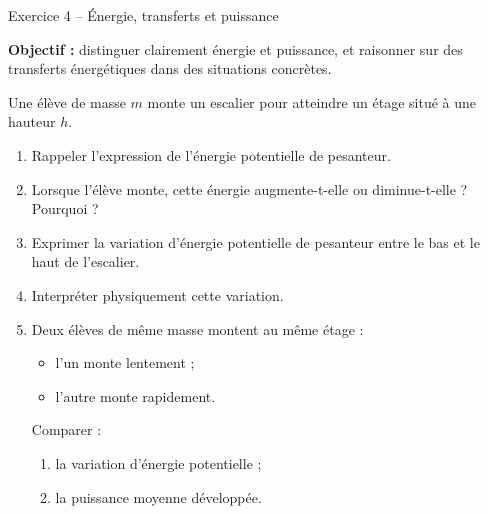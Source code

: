 \documentclass[11pt,a4paper]{article}
\begin{document}
\begin{exobox}{Exercice 4 -- Énergie, transferts et puissance}
\begin{objectifbox}
\textbf{Objectif :} distinguer clairement énergie et puissance, et raisonner sur des transferts énergétiques dans des situations concrètes.
\end{objectifbox}

Une élève de masse \(m\) monte un escalier pour atteindre un étage situé à une hauteur \(h\).

\begin{center}
\end{center}

\begin{enumerate}[label=\textbf{\arabic*.}]
    \item Rappeler l’expression de l’énergie potentielle de pesanteur.

    \item Lorsque l’élève monte, cette énergie augmente-t-elle ou diminue-t-elle ? Pourquoi ?

    \item Exprimer la variation d’énergie potentielle de pesanteur entre le bas et le haut de l’escalier.

    \item Interpréter physiquement cette variation.

    \item Deux élèves de même masse montent au même étage :
    \begin{itemize}
        \item l’un monte lentement ;
        \item l’autre monte rapidement.
    \end{itemize}
    Comparer :
    \begin{enumerate}[label=\alph*)]
        \item la variation d’énergie potentielle ;
        \item la puissance moyenne développée.
    \end{enumerate}


\end{enumerate}
\end{exobox}
\end{document}
